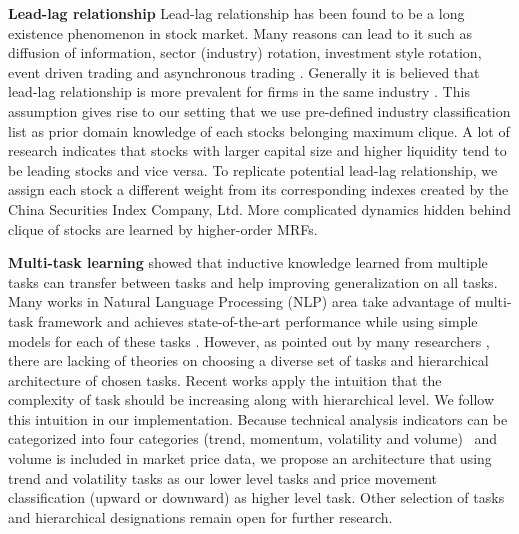 \documentclass[sigconf]{acmart}
\renewcommand{\citename}{\citet}
\renewcommand{\cite}{\citep}
\begin{document}
\textbf{Lead-lag relationship} Lead-lag relationship has been found to be a long existence phenomenon in stock market. Many reasons can lead to it such as diffusion of information, sector (industry) rotation, investment style rotation, event driven trading and asynchronous trading
\cite{lo1990contrarian,chordia2000trading,conrad1988time,hameed1997time}. Generally it is believed that lead-lag relationship is more prevalent for firms in the same industry \cite{hou2007industry}. This assumption gives rise to our setting that we use pre-defined industry classification list \cite{ths} as prior domain knowledge of each stock\textquotesingle s belonging maximum
clique. A lot of research \cite{brennan1993investment,hou2007industry,badrinath1995shepherds,mcqueen1996delayed}
indicates that stocks with larger capital size and higher liquidity tend to be leading stocks and vice versa.
To replicate potential lead-lag relationship, we assign each stock a different weight from its corresponding indexes created by the China Securities Index Company, Ltd. More complicated dynamics hidden behind clique
of stocks are learned by higher-order MRFs.

\textbf{Multi-task learning} \citename{caruana1993multitask}
showed that inductive knowledge learned from multiple tasks can
transfer between tasks and help improving generalization on all
tasks. Many works in Natural Language Processing (NLP) area take
advantage of multi-task framework and achieves state-of-the-art
performance while using simple models for each of these tasks
\cite{sogaard2016deep,hashimoto2016joint}. However, as pointed
out by many researchers
\cite{caruana1993multitask,ruder2017overview}, there are lacking
of theories on choosing a diverse set of tasks and hierarchical
architecture of chosen tasks. Recent works
\cite{sogaard2016deep,hashimoto2016joint} apply the intuition
that the complexity of task should be increasing along with
hierarchical level. We follow this intuition in our
implementation. Because technical analysis indicators can be
categorized into four categories (trend, momentum, volatility and
volume)~\cite{kirkpatrick2010technical} and volume is included in
market price data, we propose an architecture that using trend
and volatility tasks as our lower level tasks and price movement
classification (upward or downward) as higher level task. Other
selection of tasks and hierarchical designations remain open for
further research.
\end{document}
